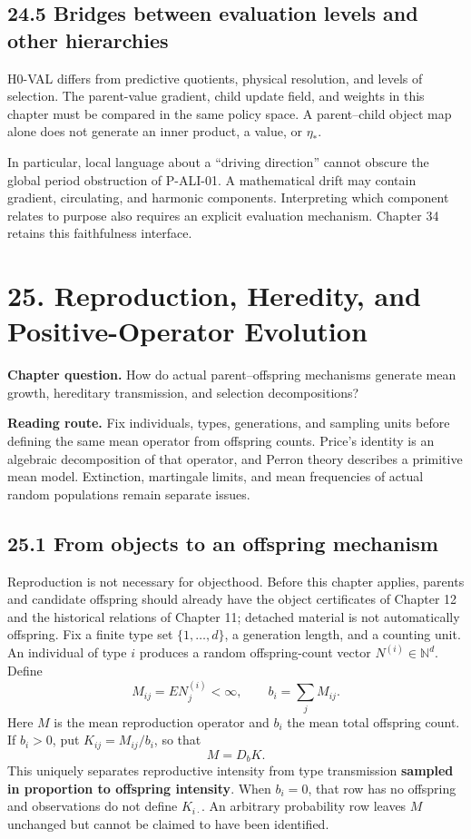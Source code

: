 \documentclass[
  english,
  11pt,
  oneside]{book}
\begin{document}
\section{24.5 Bridges between evaluation levels and other hierarchies}\label{bridges-between-evaluation-levels-and-other-hierarchies}

H0-VAL differs from predictive quotients, physical resolution, and levels of selection. The parent-value gradient, child update field, and weights in this chapter must be compared in the same policy space. A parent--child object map alone does not generate an inner product, a value, or \(\eta_*\).

In particular, local language about a ``driving direction'' cannot obscure the global period obstruction of P-ALI-01. A mathematical drift may contain gradient, circulating, and harmonic components. Interpreting which component relates to purpose also requires an explicit evaluation mechanism. Chapter 34 retains this faithfulness interface.

\chapter{25. Reproduction, Heredity, and Positive-Operator Evolution}\label{ch-25}

\textbf{Chapter question.} How do actual parent--offspring mechanisms generate mean growth, hereditary transmission, and selection decompositions?

\textbf{Reading route.} Fix individuals, types, generations, and sampling units before defining the same mean operator from offspring counts. Price's identity is an algebraic decomposition of that operator, and Perron theory describes a primitive mean model. Extinction, martingale limits, and mean frequencies of actual random populations remain separate issues.

\section{25.1 From objects to an offspring mechanism}\label{from-objects-to-an-offspring-mechanism}

Reproduction is not necessary for objecthood. Before this chapter applies, parents and candidate offspring should already have the object certificates of Chapter 12 and the historical relations of Chapter 11; detached material is not automatically offspring. Fix a finite type set \(\{1,\ldots,d\}\), a generation length, and a counting unit. An individual of type \(i\) produces a random offspring-count vector \(N^{(i)}\in\mathbb N^d\). Define \[M_{ij}=E N_j^{(i)}<\infty,\qquad b_i=\sum_jM_{ij}.\] Here \(M\) is the mean reproduction operator and \(b_i\) the mean total offspring count. If \(b_i>0\), put \(K_{ij}=M_{ij}/b_i\), so that \[M=D_bK.\] This uniquely separates reproductive intensity from type transmission \textbf{sampled in proportion to offspring intensity}. When \(b_i=0\), that row has no offspring and observations do not define \(K_{i\cdot}\). An arbitrary probability row leaves \(M\) unchanged but cannot be claimed to have been identified.
\end{document}
